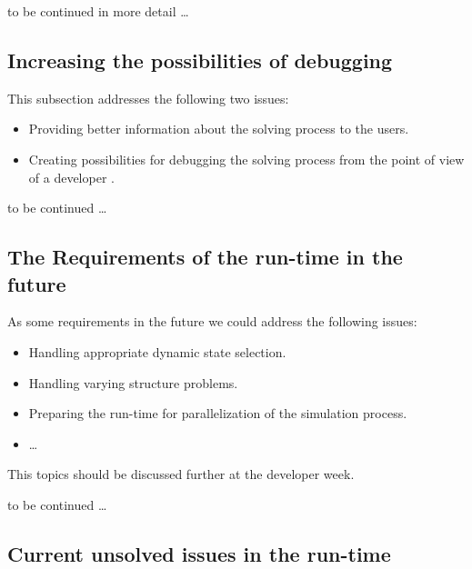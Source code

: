 to be continued in more detail \ldots

\subsection{Increasing the possibilities of debugging}\label{sec:debugging}

This subsection addresses the following two issues:
\begin{itemize}
  \item Providing better information about the solving process to the users.
  \item Creating possibilities for debugging the solving process from the
  point of view of a developer \cite{Pop2007}.
\end{itemize}

to be continued \ldots

\subsection{The Requirements of the run-time in the
future}\label{sec:runtimefuture}

As some requirements in the future we could address the following issues:
\begin{itemize}
  \item Handling appropriate dynamic state selection.  
  \item Handling varying structure problems. 
  \item Preparing the run-time for parallelization of the simulation
  process. 
 \item \ldots
\end{itemize}
This topics should be discussed further at the developer week. 

to be continued \ldots

\subsection{Current unsolved issues in the run-time}\label{sec:currentsbugs}

